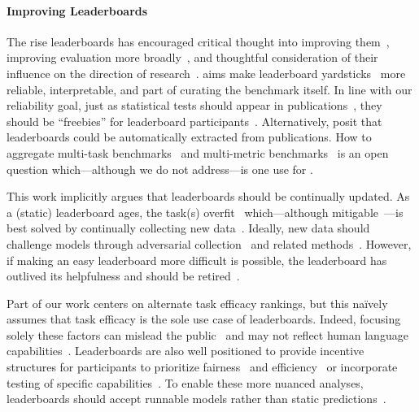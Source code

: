 \paragraph{\textbf{Improving Leaderboards}}
The rise \nlp{} leaderboards has encouraged critical thought into
improving them~\citep{linzen2020progress}, improving evaluation more
broadly~\citep{eger2020workshop}, and thoughtful consideration of
their influence on the direction of
research~\citep{sculley2018curse,dotan2020value}.
\name{} aims make leaderboard
yardsticks~\citep{hernandez2020yardsticks} more reliable,
interpretable, and part of curating the benchmark itself.
In line
with our reliability goal, just as statistical tests should appear in
publications~\citep{dror2018guide,Dodge2019ShowYW}, they should be
``freebies'' for leaderboard
participants~\citep{ethayarajh2020utility}.  Alternatively,
\citet{hou2019leader} posit that leaderboards could be automatically
extracted from publications.
How to aggregate multi-task
benchmarks~\citep{wang2018glue,wang2019superglue,fisch2019mrqa} and multi-metric benchmarks~\citep{ma2021dynaboard} is an
open question which---although we do not address---is one use for
\irt{}.


This work implicitly argues that leaderboards should be
continually updated.  As a (static) leaderboard ages, the task(s)
overfit~\citep{recht2019generalize} which---although
mitigable~\citep{blum2015ladder,andersonCook2019host}---is best solved
by continually collecting new data~\citep{kiela2021dynabench}.
Ideally, new data should challenge models through adversarial
collection~\citep{wallace2018trick,nie2019adversarial} and related
methods~\citep{Gardner2020-gn}.  However, if making an easy
leaderboard more difficult is possible, the
leaderboard has outlived its helpfulness and should be retired~\citep{voorhees1999trec8}.

Part of our work centers on alternate task efficacy rankings, but this
na\"ively assumes that task efficacy is the sole use case of
leaderboards.
Indeed, focusing solely these factors can mislead the
public~\citep{paullada2020data} and may not reflect human language
capabilities~\citep{schlangen2020targeting}.
Leaderboards are also well positioned to provide incentive structures
for participants to prioritize fairness~\citep{bender2018data} and
efficiency~\citep{strubell2019energy,schwartz2020green,min2021efficientqa}
or incorporate testing of specific
capabilities~\citep{ribeiro2020checklist,Dunietz2020-ty}.
To enable these more nuanced analyses, leaderboards should accept
runnable models rather than static
predictions~\citep{ma2021dynaboard}.

